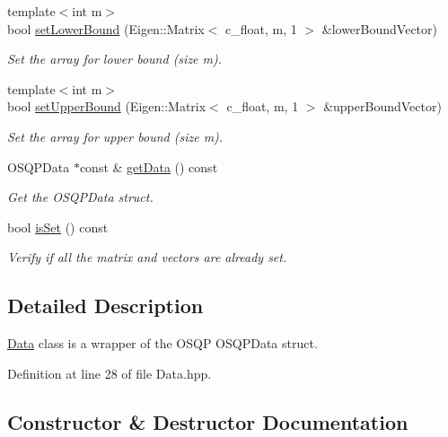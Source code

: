 \begin{DoxyCompactItemize}
{\footnotesize template$<$int m$>$ }\\bool \mbox{\hyperlink{classOsqpEigen_1_1Data_a2309f26732b40ef31a639ab8d0478e18}{set\+Lower\+Bound}} (Eigen\+::\+Matrix$<$ c\+\_\+float, m, 1 $>$ \&lower\+Bound\+Vector)
\begin{DoxyCompactList}\small\item\em Set the array for lower bound (size m). \end{DoxyCompactList}\item 
{\footnotesize template$<$int m$>$ }\\bool \mbox{\hyperlink{classOsqpEigen_1_1Data_a0c8a933f59793f4ecb92f6b04917d3ac}{set\+Upper\+Bound}} (Eigen\+::\+Matrix$<$ c\+\_\+float, m, 1 $>$ \&upper\+Bound\+Vector)
\begin{DoxyCompactList}\small\item\em Set the array for upper bound (size m). \end{DoxyCompactList}\item 
O\+S\+Q\+P\+Data $\ast$const  \& \mbox{\hyperlink{classOsqpEigen_1_1Data_a4d9b55f6a91c0f83a178cc6927c2599b}{get\+Data}} () const
\begin{DoxyCompactList}\small\item\em Get the O\+S\+Q\+P\+Data struct. \end{DoxyCompactList}\item 
bool \mbox{\hyperlink{classOsqpEigen_1_1Data_aac543c780466b0db451ca60f0a5753eb}{is\+Set}} () const
\begin{DoxyCompactList}\small\item\em Verify if all the matrix and vectors are already set. \end{DoxyCompactList}\end{DoxyCompactItemize}


\subsection{Detailed Description}
\mbox{\hyperlink{classOsqpEigen_1_1Data}{Data}} class is a wrapper of the O\+S\+QP O\+S\+Q\+P\+Data struct. 

Definition at line 28 of file Data.\+hpp.



\subsection{Constructor \& Destructor Documentation}
\mbox{\label{classOsqpEigen_1_1Data_abc922eb476cd94d8cff33b41aa540132}} 

